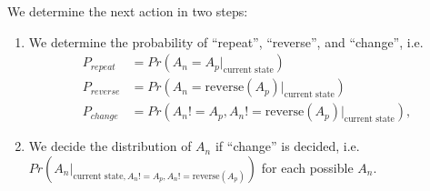 We determine the next action in two steps:
\begin{enumerate}
    \item We determine the probability of ``repeat'', ``reverse'', and ``change'',
        i.e.
        \begin{align*}
        P_{repeat}  &= Pr(A_n = A_p |_{\textrm{current state}}) \\
        P_{reverse} &= Pr(A_n = \textrm{reverse}(A_p)|_{\textrm{current state}})\\
        P_{change}  &= Pr(A_n != A_p, A_n != \textrm{reverse}(A_p)|_{\textrm{current state}}),
    \end{align*}
    \item We decide the distribution of $A_n$ if ``change'' is decided, 
        i.e. $Pr(A_n |_{\textrm{current state}, A_n != A_p, A_n != \textrm{reverse}(A_p)})$ 
        for each possible $A_n$. 
\end{enumerate}




